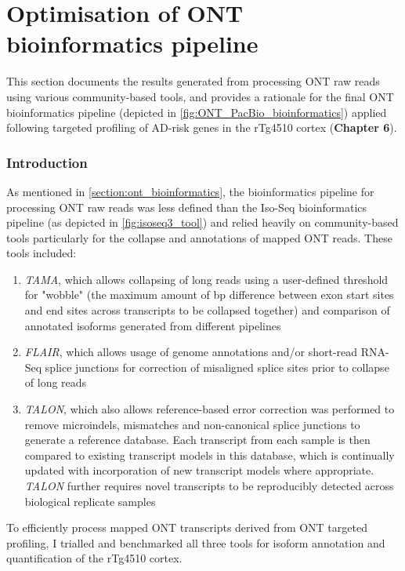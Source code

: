 \chapter{Optimisation of ONT bioinformatics pipeline}\label{app_ONTBioinformatics}
\label{ONT_Bioinformatics_appendix}

\stoptocwriting
This section documents the results generated from processing ONT raw reads using various community-based tools, and provides a rationale for the final ONT bioinformatics pipeline (depicted in \cref{fig:ONT_PacBio_bioinformatics}) applied following targeted profiling of AD-risk genes in the rTg4510 cortex (\textbf{Chapter 6}). 

\subsection{Introduction}
As mentioned in \cref{section:ont_bioinformatics}, the bioinformatics pipeline for processing ONT raw reads was less defined than the Iso-Seq bioinformatics pipeline (as depicted in \cref{fig:isoseq3_tool}) and relied heavily on community-based tools particularly for the collapse and annotations of mapped ONT reads. These tools included:
\begin{enumerate}
	\item \textit{TAMA}, which allows collapsing of long reads using a user-defined threshold for "wobble" (the maximum amount of bp difference between exon start sites and end sites across transcripts to be collapsed together) and comparison of annotated isoforms generated from different pipelines
	\item \textit{FLAIR}, which allows usage of genome annotations and/or short-read RNA-Seq splice junctions for correction of misaligned splice sites prior to collapse of long reads  
	\item \textit{TALON}, which also allows reference-based error correction was performed to remove microindels, mismatches and non-canonical splice junctions to generate a reference database. Each transcript from each sample is then compared to existing transcript models in this database, which is continually updated with incorporation of new transcript models where appropriate. \textit{TALON} further requires novel transcripts to be reproducibly detected across biological replicate samples 
\end{enumerate}
To efficiently process mapped ONT transcripts derived from ONT targeted profiling, I trialled and benchmarked all three tools for isoform annotation and quantification of the rTg4510 cortex. 

